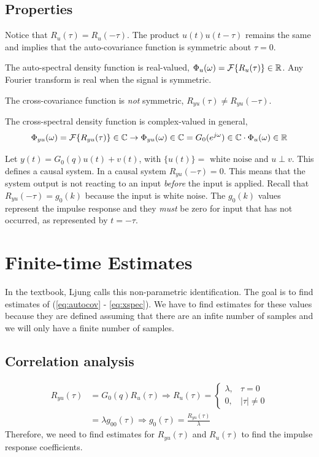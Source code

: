 \subsection{Properties}
Notice that $R_u(\tau)=R_u(-\tau)$. The product $u(t)u(t-\tau)$ remains the same and implies that the auto-covariance function is symmetric about $\tau=0$.

The auto-spectral density function is real-valued, $\Phi_u(\omega) = \mathcal{F}\{R_u(\tau)\}\in\mathbb{R}$. Any Fourier transform is real when the signal is symmetric.

The cross-covariance function is \textit{not} symmetric, $R_{yu}(\tau)\neq R_{yu}(-\tau)$.

The cross-spectral density function is complex-valued in general,
$$\Phi_{yu}(\omega) = \mathcal{F}\{R_{yu}(\tau)\}\in\mathbb{C} \rightarrow \Phi_{yu}(\omega)\in\mathbb{C} = G_0(e^{j\omega})\in\mathbb{C} \cdot \Phi_u(\omega)\in\mathbb{R}$$

Let $y(t) = G_0(q)u(t)+v(t)$, with $\{u(t)\}=\text{ white noise}$ and $u\perp v$. This defines a causal system. In a causal system $R_{yu}(-\tau)=0$. This means that the system output is not reacting to an input \textit{before} the input is applied. Recall that $R_{yu}(-\tau)=g_0(k)$ because the input is white noise. The $g_0(k)$ values represent the impulse response and they \textit{must} be zero for input that has not occurred, as represented by $t=-\tau$.

\section{Finite-time Estimates}
In the textbook, Ljung calls this non-parametric identification. The goal is to find estimates of (\ref{eq:autocov} - \ref{eq:xspec}). We have to find estimates for these values because they are defined assuming that there are an infite number of samples and we will only have a finite number of samples.

\subsection{Correlation analysis}
\begin{align*}
R_{yu}(\tau) &= G_0(q)R_u(\tau) \Rightarrow R_u(\tau) = \begin{cases} \lambda, & \tau=0 \\ 0, & |\tau|\neq 0 \end{cases} \\
&= \lambda g_00(\tau) \Rightarrow g_0(\tau) = \frac{R_{yu}(\tau)}{\lambda}
\end{align*}
Therefore, we need to find estimates for $R_{yu}(\tau)$ and $R_u(\tau)$ to find the impulse response coefficients.

